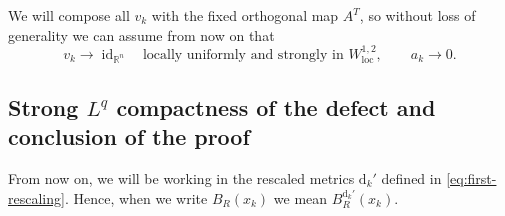 \documentclass[12pt,a4paper,reqno]{amsart}
\newcommand{\R}{\mathbb R}
\newcommand{\loc}{\mathrm{loc}}
\newcommand{\id}{\operatorname{id}}
\begin{document}
We will compose all $v_k$ with the fixed orthogonal map $A^T$, so without loss of generality we can assume from now on that
\begin{equation}\label{eq:v-to-id}
 v_k\to \id_{\R^n}
 \quad\text{locally uniformly and strongly in }W^{1,2}_{\loc},
 \qquad a_k\to 0.
\end{equation}


\subsection{Strong \texorpdfstring{$L^q$}{Lq}
compactness of the defect and conclusion of the proof}\label{sec:poisson-compactness}

From now on, we will be working in the rescaled metrics $\mathrm{d}_k'$ defined in \eqref{eq:first-rescaling}. Hence, when we write $B_R(x_k)$ we mean $B_R^{\mathrm{d}_k'}(x_k)$.
\end{document}
